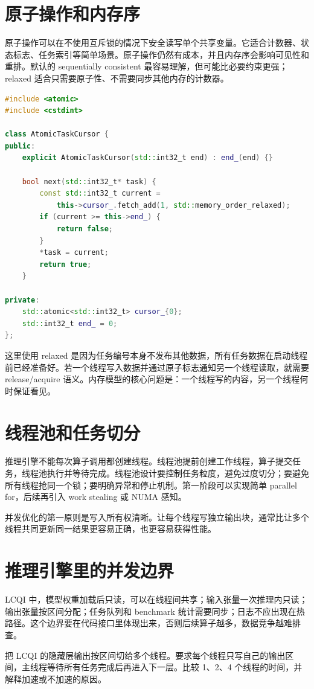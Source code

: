 \section{原子操作和内存序}

原子操作可以在不使用互斥锁的情况下安全读写单个共享变量。它适合计数器、状态标志、任务索引等简单场景。原子操作仍然有成本，并且内存序会影响可见性和重排。默认的 sequentially consistent 最容易理解，但可能比必要约束更强；relaxed 适合只需要原子性、不需要同步其他内存的计数器。

\begin{lstlisting}[language=C++,caption={任务索引用原子递增分发}]
#include <atomic>
#include <cstdint>

class AtomicTaskCursor {
public:
    explicit AtomicTaskCursor(std::int32_t end) : end_(end) {}

    bool next(std::int32_t* task) {
        const std::int32_t current =
            this->cursor_.fetch_add(1, std::memory_order_relaxed);
        if (current >= this->end_) {
            return false;
        }
        *task = current;
        return true;
    }

private:
    std::atomic<std::int32_t> cursor_{0};
    std::int32_t end_ = 0;
};
\end{lstlisting}

这里使用 relaxed 是因为任务编号本身不发布其他数据，所有任务数据在启动线程前已经准备好。若一个线程写入数据并通过原子标志通知另一个线程读取，就需要 release/acquire 语义。内存模型的核心问题是：一个线程写的内容，另一个线程何时保证看见。

\section{线程池和任务切分}

推理引擎不能每次算子调用都创建线程。线程池提前创建工作线程，算子提交任务，线程池执行并等待完成。线程池设计要控制任务粒度，避免过度切分；要避免所有线程抢同一个锁；要明确异常和停止机制。第一阶段可以实现简单 parallel for，后续再引入 work stealing 或 NUMA 感知。

\begin{keyidea}
并发优化的第一原则是写入所有权清晰。让每个线程写独立输出块，通常比让多个线程共同更新同一结果更容易正确，也更容易获得性能。
\end{keyidea}

\section{推理引擎里的并发边界}

LCQI 中，模型权重加载后只读，可以在线程间共享；输入张量一次推理内只读；输出张量按区间分配；任务队列和 benchmark 统计需要同步；日志不应出现在热路径。这个边界要在代码接口里体现出来，否则后续算子越多，数据竞争越难排查。

\begin{exercisebox}
把 LCQI 的隐藏层输出按区间切给多个线程。要求每个线程只写自己的输出区间，主线程等待所有任务完成后再进入下一层。比较 1、2、4 个线程的时间，并解释加速或不加速的原因。
\end{exercisebox}
